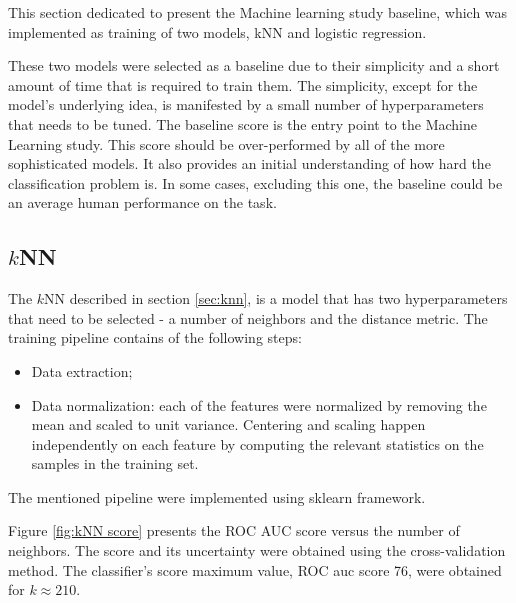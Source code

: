 This section dedicated to present the Machine learning study baseline, which was implemented as training of two models, kNN and logistic regression.
 
These two models were selected as a baseline due to their simplicity and a short amount of time that is required to train them. The simplicity, except for the model's underlying idea, is manifested by a small number of hyperparameters that needs to be tuned. The baseline score is the entry point to the Machine Learning study. This score  should be over-performed by all of the more sophisticated models. It also provides an initial understanding of how hard the classification problem is. In some cases, excluding this one, the baseline could be an average human performance on the task. 

\subsection{$k$NN} 
\label{sec:KNN_result}

The $k$NN described in section \ref{sec:knn}, is a model that has two hyperparameters that need to be selected - a number of neighbors and the distance metric. The training pipeline contains of the following steps:

\begin{itemize}
    \item Data extraction;
    \item Data normalization: each of the features were normalized by removing the mean and scaled to unit variance. Centering and scaling happen independently on each feature by computing the relevant statistics on the samples in the training set. 
\end{itemize}
The mentioned pipeline were implemented using sklearn framework\cite{sklearn}.  

Figure \ref{fig:kNN score} presents the ROC AUC score versus the number of neighbors. The score and its uncertainty were obtained using the cross-validation method. The classifier's score maximum value, ROC auc score 76, were obtained for $k \approx 210$.  

